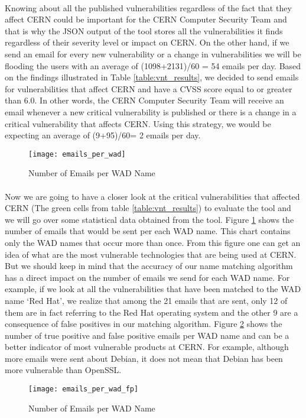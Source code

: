\paragraph{}
Knowing about all the published vulnerabilities regardless of the fact that they affect CERN could be important for the CERN Computer Security Team and that is why the JSON output of the tool stores all the vulnerabilities it finds regardless of their severity level or impact on CERN. On the other hand, if we send an email for every new vulnerability or a change in vulnerabilities we will be flooding the users with an average of (1098+2131)/60 = 54 emails per day. Based on the findings illustrated in Table \ref{table:vnt_results}, we decided to send emails for vulnerabilities that affect CERN and have a CVSS score equal to or greater than 6.0. In other words, the CERN Computer Security Team will receive an email whenever a new critical vulnerability is published or there is a change in a critical vulnerability that affects CERN. Using this strategy, we would be expecting an average of (9+95)/60= 2 emails per day. 
\begin{figure}[h!]
\label{figure:emails_per_wad}
  \centering
    \texttt{[image: emails\_per\_wad]}
  \caption{Number of Emails per WAD Name}
\end{figure}

\paragraph{}
Now we are going to have a closer look at the critical vulnerabilities that affected CERN (The green cells from table \ref{table:vnt_results}) to evaluate the tool and we will go over some statistical data obtained from the tool.
Figure \ref{figure:emails_per_wad} shows the number of emails that would be sent per each WAD name. This chart contains only the WAD names that occur more than once. From this figure one can get an idea of what are the most vulnerable technologies that are being used at CERN. But we should keep in mind that the accuracy of our name matching algorithm has a direct impact on the number of emails we send for each WAD name. For example, if we look at all the vulnerabilities that have been matched to the WAD name `Red Hat', we realize that among the 21 emails that are sent, only 12 of them are in fact referring to the Red Hat operating system and the  other 9 are a consequence of false positives in our matching algorithm. Figure \ref{figure:emails_per_wad_fp} shows the number of true positive and false positive emails per WAD name and can be a better indicator of most vulnerable products at CERN. For example, although more emails were sent about Debian, it does not mean that Debian has been more vulnerable than OpenSSL.
\\
\begin{figure}[h!]
  \centering
    \texttt{[image: emails\_per\_wad\_fp]}
  \caption{Number of Emails per WAD Name}
  \label{figure:emails_per_wad_fp}

\end{figure}



